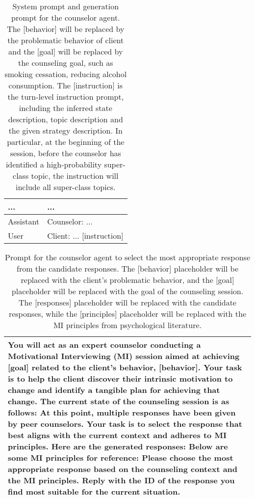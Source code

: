 \begin{table*}[tb]
\begin{tabularx}{\textwidth}{lX}
... & ...  \\ \midrule
Assistant & {\sf \footnotesize Counselor: ... }\\ \hline
User & {\sf \footnotesize Client: ... [instruction]}
\\ \bottomrule
\end{tabularx}
\caption{System prompt and generation prompt for the counselor agent. The [behavior] will be replaced by the problematic behavior of client and the [goal] will be replaced by the counseling goal, such as smoking cessation, reducing alcohol consumption. The [instruction] is the turn-level instruction prompt, including the inferred state description, topic description and the given strategy description. In particular, at the beginning of the session, before the counselor has identified a high-probability super-class topic, the instruction will include all super-class topics.}
\label{tab:couneslor system}
\end{table*}


\begin{table*}[tb]
\begin{tabularx}{\textwidth}{X}
\toprule
{\sf \footnotesize You will act as an expert counselor conducting a Motivational Interviewing (MI) session aimed at achieving [goal] related to the client's behavior, [behavior]. Your task is to help the client discover their intrinsic motivation to change and identify a tangible plan for achieving that change. The current state of the counseling session is as follows: \newline [conversation] \newline At this point, multiple responses have been given by peer counselors. Your task is to select the response that best aligns with the current context and adheres to MI principles. Here are the generated responses: \newline [responses] \newline \newline Below are some MI principles for reference: \newline [principles] \newline Please choose the most appropriate response based on the counseling context and the MI principles. Reply with the ID of the response you find most suitable for the current situation.}
\\ \bottomrule
\end{tabularx}
\caption{Prompt for the counselor agent to select the most appropriate response from the candidate responses. The [behavior] placeholder will be replaced with the client's problematic behavior, and the [goal] placeholder will be replaced with the goal of the counseling session. The [responses] placeholder will be replaced with the candidate responses, while the [principles] placeholder will be replaced with the MI principles from psychological literature.}
\label{tab:response rank}
\end{table*}


